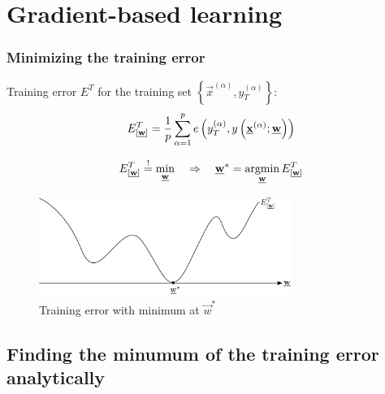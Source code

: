 \section{Gradient-based learning}

\begin{frame}\frametitle{Minimizing the training error}
	Training error $E^T$ for the training set $\left\{\vec x^{(\alpha)}, y^{(\alpha)}_{T}\right\}$: 
    \begin{equation}
        {E}^T_{[\underline{\mathbf{w}}]} = \frac{1}{p} \sum\limits_{\alpha = 1}^p 
					e\left(y^{(\alpha)}_T, y\left(\underline{\mathbf{x}}^{(\alpha)}; \underline{\mathbf{w}}\right)\right)
    \end{equation}
    
    
    \begin{equation}
        \ETw \eqexcl \min_{\vec w} \quad \Rightarrow \quad \vec w^{*} = \argmin_{\vec w} \ETw
    \end{equation}

    \begin{figure}[h]
        \centering
        \includegraphics[height=3.25cm]{img/section1_fig19_no_steps}
        \caption{Training error with minimum at $\vec w^{*}$}
        \label{fig:training_error} 
    \end{figure}
    
    \pause 
    

\end{frame}

\subsection{Finding the minumum of the training error analytically}

